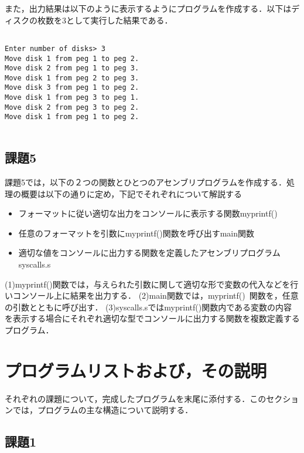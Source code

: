 \documentclass[a4j]{jarticle}
\begin{document}
また，出力結果は以下のように表示するようにプログラムを作成する．以下はディスクの枚数を3として実行した結果である．

{\baselineskip 3mm
\begin{verbatim}

Enter number of disks> 3
Move disk 1 from peg 1 to peg 2.
Move disk 2 from peg 1 to peg 3.
Move disk 1 from peg 2 to peg 3.
Move disk 3 from peg 1 to peg 2.
Move disk 1 from peg 3 to peg 1.
Move disk 2 from peg 3 to peg 2.
Move disk 1 from peg 1 to peg 2.
 
\end{verbatim}
}



\subsection{課題5}

課題5では，以下の２つの関数とひとつのアセンブリプログラムを作成する．処理の概要は以下の通りに定め，下記でそれぞれについて解説する

\begin{itemize}
\item[(1)]フォーマットに従い適切な出力をコンソールに表示する関数myprintf()
\item[(2)]任意のフォーマットを引数にmyprintf()関数を呼び出すmain関数
\item[(3)]適切な値をコンソールに出力する関数を定義したアセンブリプログラムsyscalls.s
\end{itemize}


(1)myprintf()関数では，与えられた引数に関して適切な形で変数の代入などを行いコンソール上に結果を出力する．
(2)main関数では，myprintf() 関数を，任意の引数とともに呼び出す．
(3)syscalls.sではmyprintf()関数内である変数の内容を表示する場合にそれぞれ適切な型でコンソールに出力する関数を複数定義するプログラム．



%
%

\section{プログラムリストおよび，その説明}

それぞれの課題について，完成したプログラムを末尾に添付する．このセクションでは，プログラムの主な構造について説明する．

\subsection{課題1}
\end{document}
